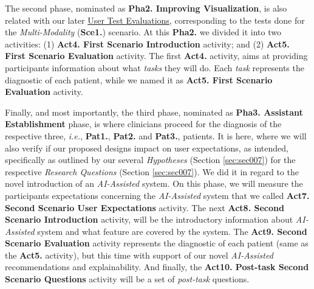 \hfill

The second phase, nominated as \textbf{Pha2. Improving Visualization}, is also related with our later \href{https://github.com/MIMBCD-UI/prototype-breast-screening/wiki/User-Research#user-test-evaluations-}{User Test Evaluations}, corresponding to the tests done for the \textit{Multi-Modality} (\textbf{Sce1.}) scenario. At this \textbf{Pha2.} we divided it into two activities: (1) \textbf{Act4. First Scenario Introduction} activity; and (2) \textbf{Act5. First Scenario Evaluation} activity. The first \textbf{Act4.} activity, aims at providing participants information about what \textit{tasks} they will do. Each \textit{task} represents the diagnostic of each patient, while we named it as \textbf{Act5. First Scenario Evaluation} activity.

Finally, and most importantly, the third phase, nominated as \textbf{Pha3. Assistant Establishment} phase, is where clinicians proceed for the diagnosis of the respective three, \textit{i.e.}, \textbf{Pat1.}, \textbf{Pat2.} and \textbf{Pat3.}, patients. It is here, where we will also verify if our proposed designs impact \cite{amershi2019guidelines, kocielnik2019will} on user expectations, as intended, specifically as outlined by our several \textit{Hypotheses} (Section \ref{sec:sec007}) for the respective \textit{Research Questions} (Section \ref{sec:sec007}). We did it in regard to the novel introduction of an \textit{AI-Assisted} system. On this phase, we will measure the participants expectations concerning the \textit{AI-Assisted} system that we called \textbf{Act7. Second Scenario User Expectations} activity. The next \textbf{Act8. Second Scenario Introduction} activity, will be the introductory information about \textit{AI-Assisted} system and what feature are covered by the system. The \textbf{Act9. Second Scenario Evaluation} activity represents the diagnostic of each patient (same as the \textbf{Act5.} activity), but this time with support of our novel \textit{AI-Assisted} recommendations and explainability. And finally, the \textbf{Act10. Post-task Second Scenario Questions} activity will be a set of \textit{post-task} questions.

